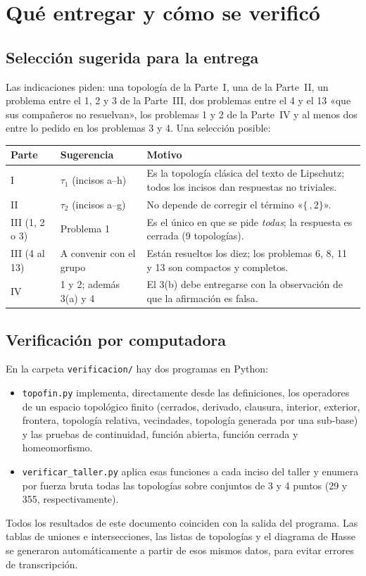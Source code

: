 \section{Qué entregar y cómo se verificó}

\subsection{Selección sugerida para la entrega}
Las indicaciones piden: una topología de la Parte~I, una de la Parte~II, un problema entre el 1, 2 y 3 de la
Parte~III, dos problemas entre el 4 y el 13 «que sus compañeros no resuelvan», los problemas 1 y 2 de la Parte~IV y
al menos dos entre lo pedido en los problemas 3 y 4. Una selección posible:
\begin{center}\small\renewcommand{\arraystretch}{1.25}
\begin{tabular}{@{}p{2.6cm}p{5.2cm}p{7.4cm}@{}}\toprule
\textbf{Parte} & \textbf{Sugerencia} & \textbf{Motivo}\\ \midrule
I & $\tau_1$ (incisos a–h) & Es la topología clásica del texto de Lipschutz; todos los incisos dan respuestas no triviales.\\
II & $\tau_2$ (incisos a–g) & No depende de corregir el término «$\{\,,2\}$».\\
III (1, 2 o 3) & Problema 1 & Es el único en que se pide \emph{todas}; la respuesta es cerrada (9 topologías).\\
III (4 al 13) & A convenir con el grupo & Están resueltos los diez; los problemas 6, 8, 11 y 13 son compactos y completos.\\
IV & 1 y 2; además 3(a) y 4 & El 3(b) debe entregarse con la observación de que la afirmación es falsa.\\ \bottomrule
\end{tabular}\end{center}

\subsection{Verificación por computadora}
En la carpeta \texttt{verificacion/} hay dos programas en Python:
\begin{itemize}
\item \texttt{topofin.py} implementa, directamente desde las definiciones, los operadores de un espacio topológico
finito (cerrados, derivado, clausura, interior, exterior, frontera, topología relativa, vecindades, topología
generada por una sub-base) y las pruebas de continuidad, función abierta, función cerrada y homeomorfismo.
\item \texttt{verificar\_taller.py} aplica esas funciones a cada inciso del taller y enumera por fuerza bruta todas
las topologías sobre conjuntos de 3 y 4 puntos (29 y 355, respectivamente).
\end{itemize}
Todos los resultados de este documento coinciden con la salida del programa. Las tablas de uniones e intersecciones,
las listas de topologías y el diagrama de Hasse se generaron automáticamente a partir de esos mismos datos, para
evitar errores de transcripción.

